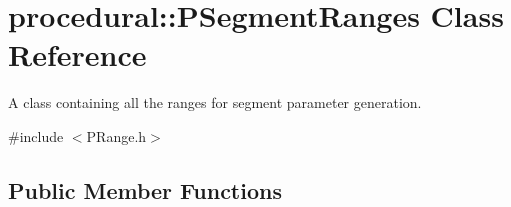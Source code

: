 \hypertarget{classprocedural_1_1_p_segment_ranges}{\section{procedural\-:\-:P\-Segment\-Ranges Class Reference}
\label{classprocedural_1_1_p_segment_ranges}
}


A class containing all the ranges for segment parameter generation.  




{\ttfamily \#include $<$P\-Range.\-h$>$}

\subsection*{Public Member Functions}
